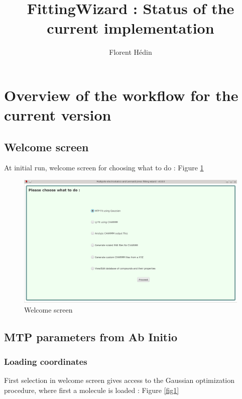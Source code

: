 \documentclass[12pt,a4paper]{article}
\date{}
\author{Florent H\'{e}din}
\title{FittingWizard : Status of the current implementation}
\begin{document}
\maketitle

\tableofcontents

\section{Overview of the workflow for the current version}

\subsection{Welcome screen}

At initial run, welcome screen for choosing what to do : Figure \ref{fig0} \\


\begin{figure}[h!]
\centering
\includegraphics[width=0.9\linewidth]{pics/scr0}
\caption{Welcome screen}
\label{fig0}
\end{figure}

\subsection{MTP parameters from Ab Initio}

\subsubsection{Loading coordinates}

First selection in welcome screen gives access to the Gaussian optimization procedure, where first 
a molecule 
is loaded : Figure \ref{fig1} \\

\end{document}
